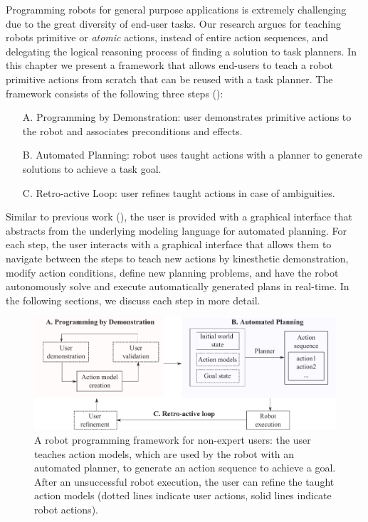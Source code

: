 Programming robots for general purpose applications is extremely challenging due to the great diversity of end-user tasks.
Our research argues for teaching robots primitive or \textit{atomic} actions, instead of entire action sequences, and delegating the logical reasoning process of finding a solution to task planners.
In this chapter we present a framework that allows end-users to teach a robot primitive actions from scratch that can be reused with a task planner.
The framework consists of the following three steps (): 
\begin{enumerate}
	\item[A.]{Programming by Demonstration: user demonstrates primitive actions to the robot and associates preconditions and effects.}
	\item[B.]{Automated Planning: robot uses taught actions with a planner to generate solutions to achieve a task goal.}
	\item[C.]{Retro-active Loop: user refines taught actions in case of ambiguities.}
\end{enumerate}
Similar to previous work (\cite{perzylo2016intuitive}), the user is provided with a graphical interface that abstracts from the underlying modeling language for automated planning.
For each step, the user interacts with a graphical interface that allows them to navigate between the steps to teach new actions by kinesthetic demonstration, modify action conditions, define new planning problems, and have the robot autonomously solve and execute automatically generated plans in real-time.
In the following sections, we discuss each step in more detail. 

\begin{figure}[!h]
	\centering
	\includegraphics[width=\linewidth]{figures/framework}
	\caption{A robot programming framework for non-expert users: the user teaches action models, which are used by the robot with an automated planner, to generate an action sequence to achieve a goal.
After an unsuccessful robot execution, the user can refine the taught action models (dotted lines indicate user actions, solid lines indicate robot actions).}
	\label{fig:framework}
\end{figure}

